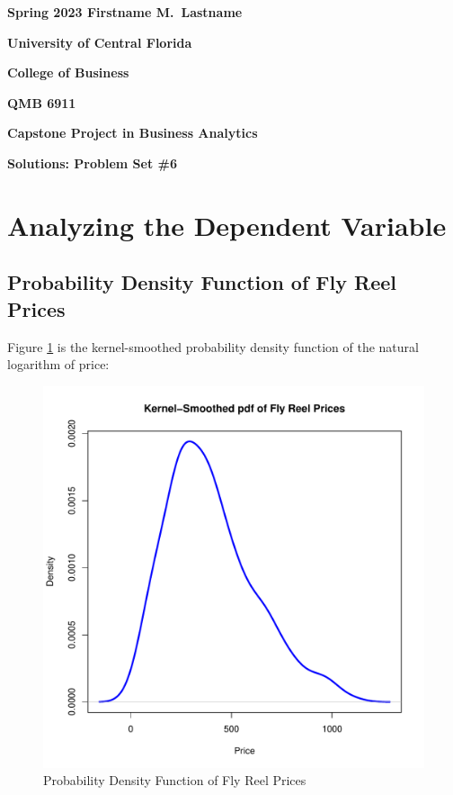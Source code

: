 \documentclass[11pt]{paper}
\begin{document}

\pagestyle{empty}
{\noindent\bf Spring 2023 \hfill Firstname M.~Lastname}
\vskip 16pt
\centerline{\bf University of Central Florida}
\centerline{\bf College of Business}
\vskip 16pt
\centerline{\bf QMB 6911}
\centerline{\bf Capstone Project in Business Analytics}
\vskip 10pt
\centerline{\bf Solutions:  Problem Set \#6}
\vskip 32pt
\noindent


\section{Analyzing the Dependent Variable}

\subsection{Probability Density Function of Fly Reel Prices}

Figure \ref{fig:density_prices} is the kernel-smoothed probability density function of the natural logarithm of
price:

\begin{figure}[h!]
  \centering
  \includegraphics[scale = 0.5, keepaspectratio=true]{../Figures/density_prices}
  \caption{Probability Density Function of Fly Reel Prices} \label{fig:density_prices}
\end{figure}
\end{document}
